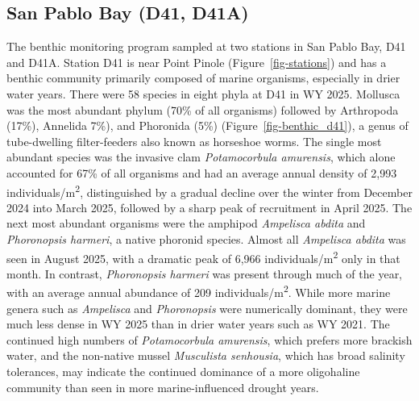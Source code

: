 \documentclass[
  letterpaper,
]{article}
\begin{document}
\subsection{San Pablo Bay (D41, D41A)}\label{san-pablo-bay-d41-d41a}

The benthic monitoring program sampled at two stations in San Pablo Bay,
D41 and D41A. Station D41 is near Point Pinole
(Figure~\ref{fig-stations}) and has a benthic community primarily
composed of marine organisms, especially in drier water years. There
were 58 species in eight phyla at D41 in WY 2025. Mollusca was the most
abundant phylum (70\% of all organisms) followed by Arthropoda (17\%),
Annelida 7\%), and Phoronida (5\%) (Figure~\ref{fig-benthic_d41}), a
genus of tube-dwelling filter-feeders also known as horseshoe worms. The
single most abundant species was the invasive clam \emph{Potamocorbula
amurensis}, which alone accounted for 67\% of all organisms and had an
average annual density of 2,993 individuals/m\textsuperscript{2},
distinguished by a gradual decline over the winter from December 2024
into March 2025, followed by a sharp peak of recruitment in April 2025.
The next most abundant organisms were the amphipod \emph{Ampelisca
abdita} and \emph{Phoronopsis harmeri}, a native phoronid species.
Almost all \emph{Ampelisca abdita} was seen in August 2025, with a
dramatic peak of 6,966 individuals/m\textsuperscript{2} only in that
month. In contrast, \emph{Phoronopsis harmeri} was present through much
of the year, with an average annual abundance of 209
individuals/m\textsuperscript{2}. While more marine genera such as
\emph{Ampelisca} and \emph{Phoronopsis} were numerically dominant, they
were much less dense in WY 2025 than in drier water years such as WY
2021. The continued high numbers of \emph{Potamocorbula amurensis},
which prefers more brackish water, and the non-native mussel
\emph{Musculista senhousia}, which has broad salinity tolerances, may
indicate the continued dominance of a more oligohaline community than
seen in more marine-influenced drought years.
\end{document}
